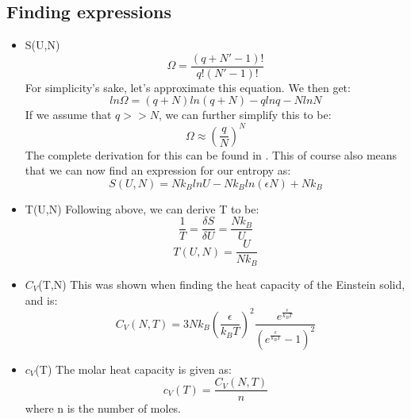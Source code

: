 \documentclass{article}
\begin{document}
\subsection{Finding expressions}
\begin{itemize}
    \item S(U,N) \newline
\begin{equation}
    \Omega = \frac{(q+N'-1)!}{q!(N'-1)!}
\end{equation}
\newline
For simplicity's sake, let's approximate this equation. We then get:
\begin{equation}
    ln \Omega = (q+N)ln(q+N) - qlnq - NlnN
\end{equation}
If we assume that $q >> N$, we can further simplify this to be:
\begin{equation}
    \Omega \approx (\frac{q}{N})^N
\end{equation}
The complete derivation for this can be found in \cite{comp}. \newline
This of course also means that we can now find an expression for our entropy as:
\begin{equation*}
    S(U,N) = Nk_B lnU - Nk_B ln(\epsilon N) + Nk_B
\end{equation*}
    \item T(U,N) \newline
    Following above, we can derive T to be:
    \begin{equation}
        \frac{1}{T} = \frac{\delta S}{\delta U} = \frac{Nk_B}{U}
    \end{equation}
    \begin{equation}
        T(U,N) = \frac{U}{Nk_B}
    \end{equation}
    \item $C_V$(T,N) \newline
    This was shown when finding the heat capacity of the Einstein solid, and is:
    \begin{equation}
    C_V(N,T) = 3Nk_B (\frac{\epsilon}{k_BT})^2 \frac{e^{\frac{\epsilon}{k_BT}}}{(e^{\frac{\epsilon}{k_BT}}-1)^2}
\end{equation}
    \item $c_V$(T) \newline
    The molar heat capacity is given as:
    \begin{equation}
        c_V(T) = \frac{C_V(N,T)}{n}
    \end{equation}
    where n is the number of moles.
\end{itemize}
\end{document}
